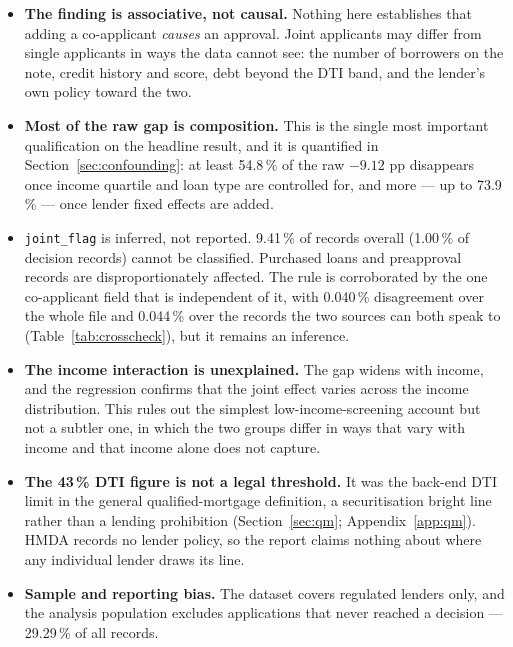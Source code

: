 \documentclass[sigconf,balance=false]{acmart}
\begin{document}
\begin{itemize}
  \item \textbf{The finding is associative, not causal.} Nothing here
        establishes that adding a co-applicant \emph{causes} an approval.
        Joint applicants may differ from single applicants in ways the data
        cannot see: the number of borrowers on the note, credit history and
        score, debt beyond the DTI band, and the lender's own policy toward
        the two.
  \item \textbf{Most of the raw gap is composition.} This is the single
        most important qualification on the headline result, and it is
        quantified in Section~\ref{sec:confounding}: at least 54.8\,\% of
        the raw $-9.12$ pp disappears once income quartile and loan type are
        controlled for, and more --- up to 73.9\,\% --- once lender fixed
        effects are added.
  \item \texttt{joint\_\allowbreak flag} is inferred, not reported.
        9.41\,\% of records overall (1.00\,\% of decision records) cannot
        be classified. Purchased loans and preapproval records are
        disproportionately affected. The rule is corroborated by the one
        co-applicant field that is independent of it, with 0.040\,\%
        disagreement over the whole file and 0.044\,\% over the records
        the two sources can both speak to
        (Table~\ref{tab:crosscheck}), but it remains an inference.
  \item \textbf{The income interaction is unexplained.} The gap widens with
        income, and the regression confirms that the joint effect varies
        across the income distribution. This rules out the simplest
        low-income-screening account but not a subtler one, in which the
        two groups differ in ways that vary with income and that income
        alone does not capture.
  \item \textbf{The 43\,\% DTI figure is not a legal threshold.} It was the
        back-end DTI limit in the general qualified-mortgage definition,
        a securitisation bright line rather than a lending prohibition
        (Section~\ref{sec:qm}; Appendix~\ref{app:qm}). HMDA records no
        lender policy, so the report claims nothing about where any
        individual lender draws its line.
  \item \textbf{Sample and reporting bias.} The dataset covers regulated
        lenders only, and the analysis population excludes applications that
        never reached a decision --- 29.29\,\% of all records.

\end{itemize}
\end{document}
